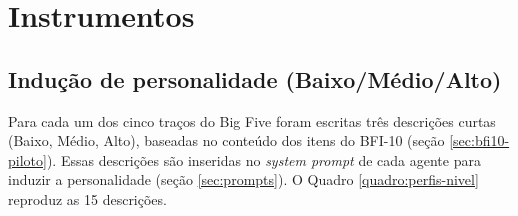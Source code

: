 \section{Instrumentos}

\subsection{Indução de personalidade (Baixo/Médio/Alto)}

Para cada um dos cinco traços do Big Five foram escritas três descrições
curtas (Baixo, Médio, Alto), baseadas no conteúdo dos itens do BFI-10
(seção \ref{sec:bfi10-piloto}). Essas
descrições são inseridas no \textit{system prompt} de cada agente para
induzir a personalidade (seção \ref{sec:prompts}). O Quadro
\ref{quadro:perfis-nivel} reproduz as 15 descrições.

